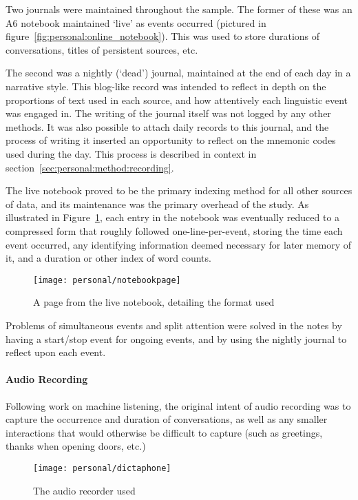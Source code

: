 Two journals were maintained throughout the sample.  The former of these was an A6 notebook maintained `live' as events occurred (pictured in figure~\ref{fig:personal:online_notebook}).  This was used to store durations of conversations, titles of persistent sources, etc.

The second was a nightly (`dead') journal, maintained at the end of each day in a narrative style.  This blog-like record was intended to reflect in depth on the proportions of text used in each source, and how attentively each linguistic event was engaged in.  The writing of the journal itself was not logged by any other methods.  It was also possible to attach daily records to this journal, and the process of writing it inserted an opportunity to reflect on the mnemonic codes used during the day.  This process is described in context in section~\ref{sec:personal:method:recording}.

The live notebook proved to be the primary indexing method for all other sources of data, and its maintenance was the primary overhead of the study.  As illustrated in Figure~\ref{fig:personal:notebookformat}, each entry in the notebook was eventually reduced to a compressed form that roughly followed one-line-per-event, storing the time each event occurred, any identifying information deemed necessary for later memory of it, and a duration or other index of word counts.

\begin{figure}[p]
    \centering
    \texttt{[image: personal/notebookpage]}
    \caption{A page from the live notebook, detailing the format used}
    \label{fig:personal:notebookformat}
\end{figure}


Problems of simultaneous events and split attention were solved in the notes by having a start/stop event for ongoing events, and by using the nightly journal to reflect upon each event.

\paragraph{Audio Recording}
Following work on machine listening, the original intent of audio recording was to capture the occurrence and duration of conversations, as well as any smaller interactions that would otherwise be difficult to capture (such as greetings, thanks when opening doors, etc.)


\begin{figure}[p]
    \centering
    \texttt{[image: personal/dictaphone]}
    \caption{The audio recorder used}
    \label{fig:personal:audiorecorder}
\end{figure}



